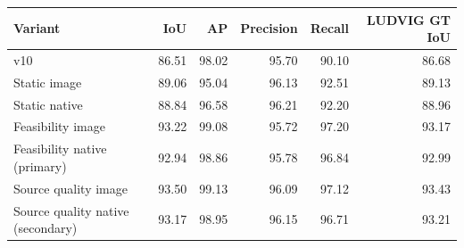 \begin{tabular}{lrrrrr}
\toprule
Variant & IoU & AP & Precision & Recall & LUDVIG GT IoU \\\midrule
v10 & 86.51 & 98.02 & 95.70 & 90.10 & 86.68 \\
Static image & 89.06 & 95.04 & 96.13 & 92.51 & 89.13 \\
Static native & 88.84 & 96.58 & 96.21 & 92.20 & 88.96 \\
Feasibility image & 93.22 & 99.08 & 95.72 & 97.20 & 93.17 \\
Feasibility native (primary) & 92.94 & 98.86 & 95.78 & 96.84 & 92.99 \\
Source quality image & 93.50 & 99.13 & 96.09 & 97.12 & 93.43 \\
Source quality native (secondary) & 93.17 & 98.95 & 96.15 & 96.71 & 93.21 \\
\bottomrule
\end{tabular}
